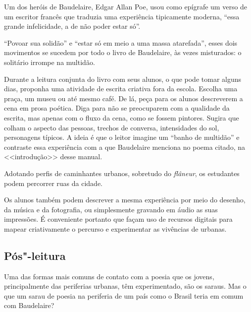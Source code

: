 \documentclass[12pt]{extarticle}
\begin{document}
\bnccativividadesleitura


Um dos heróis de Baudelaire, Edgar Allan Poe, usou como epígrafe um verso de 
um escritor francês que traduzia uma experiência tipicamente moderna, “essa 
grande infelicidade, a de não poder estar só”.
 
“Povoar sua solidão” e “estar só em meio a uma massa atarefada”,  
esses dois movimentos se sucedem por todo o livro de Baudelaire, às vezes misturados:
o solitário irrompe na multidão.


Durante a leitura conjunta do livro com seus alunos, 
o que pode tomar alguns dias, proponha uma atividade de escrita criativa 
fora da escola. Escolha uma praça, um museu ou até mesmo café. De lá, peça para os 
alunos descreverem a cena em prosa poética. Diga para não se preocuparem com a qualidade
da escrita, mas apenas com o fluxo da cena, como se fossem pintores. Sugira que colham 
o aspecto das pessoas, trechos de conversa, intensidades do sol, personagens típicos.
A ideia é que o leitor imagine um ``banho de multidão'' e contraste essa experiência 
com a que Baudelaire menciona no poema citado, na <<introdução>> desse manual. 

Adotando perfis de caminhantes urbanos, sobretudo do \textit{flâneur}, os
estudantes podem percorrer ruas da cidade.

Os alunos também podem descrever a mesma experiência por meio do desenho, 
da música e da fotografia, ou simplesmente gravando em áudio as 
suas impressões. É conveniente portanto que façam uso
de recursos digitais para mapear criativamente o percurso e
experimentar as vivências de urbanas.



\subsection{Pós"-leitura}

\bnccativividadesposleitura


Uma das formas mais comuns de contato com a poesia que os jovens, 
principalmente das periferias urbanas, têm experimentado, são 
os saraus. Mas o que um sarau de poesia na periferia de um 
país como o Brasil teria em comum com Baudelaire? 
\end{document}
